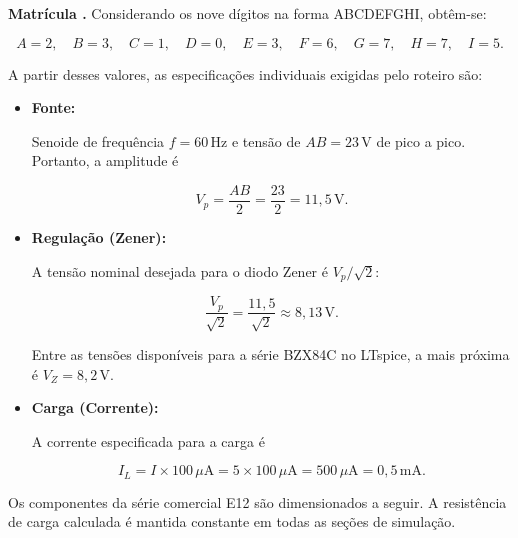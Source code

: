 \documentclass[11pt,a4paper]{article}
\begin{document}

\begin{espec}

\textbf{Matrícula .} Considerando os nove dígitos
na forma ABCDEFGHI, obtêm-se:

\begin{equation}
A=2,\quad B=3,\quad C=1,\quad D=0,\quad E=3,\quad
F=6,\quad G=7,\quad H=7,\quad I=5.
\end{equation}

A partir desses valores, as especificações individuais exigidas pelo
roteiro são:

\begin{itemize}
    \item \textbf{Fonte:}

    Senoide de frequência $f=60\,\text{Hz}$ e tensão de
    $AB=23\,\text{V}$ de pico a pico. Portanto, a amplitude é

    \[
        V_p=\frac{AB}{2}=\frac{23}{2}=11{,}5\,\text{V}.
    \]

    \item \textbf{Regulação (Zener):}

    A tensão nominal desejada para o diodo Zener é
    $V_p/\sqrt{2}$:

    \[
        \frac{V_p}{\sqrt{2}}
        =\frac{11{,}5}{\sqrt{2}}
        \approx 8{,}13\,\text{V}.
    \]

    Entre as tensões disponíveis para a série BZX84C no LTspice,
    a mais próxima é $V_Z=8{,}2\,\text{V}$.

    \item \textbf{Carga (Corrente):}

    A corrente especificada para a carga é

    \[
        I_L=I\times100\,\mu\text{A}
        =5\times100\,\mu\text{A}
        =500\,\mu\text{A}
        =0{,}5\,\text{mA}.
    \]
\end{itemize}

\end{espec}

Os componentes da série comercial E12 são dimensionados a seguir.
A resistência de carga calculada é mantida constante em todas as
seções de simulação.
\end{document}
